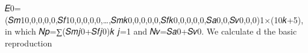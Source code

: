 𝐸0=(𝑆𝑚10,0,0,0,0,𝑆𝑓10,0,0,0,0,…,𝑆𝑚𝑘0,0,0,0,0,𝑆𝑓𝑘0,0,0,0,0,𝑆𝑎0,0,𝑆𝑣0,0,0)1×(10𝑘+5),
in which 𝑁𝑝=∑(𝑆𝑚𝑗0+𝑆𝑓𝑗0)𝑘
𝑗=1  and 𝑁𝑣=𝑆𝑎0+𝑆𝑣0. We calculate d the basic  reproduction